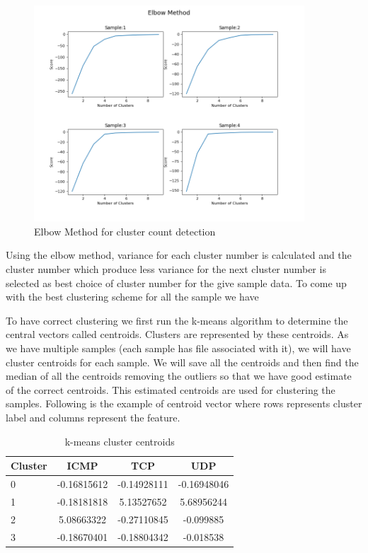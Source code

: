 \documentclass[10pt,oneside,a4paper]{article}
\begin{document}
\begin{figure}[H]
\centering
\includegraphics[width=0.90\textwidth]{elbow-method}
\caption{Elbow Method for cluster count detection} \label{fig:elbowmethod}
\end{figure}

Using the elbow method, variance for each cluster number is calculated and the cluster number which produce less variance for the next cluster number is selected as best choice of cluster number for the give sample data. To come up with the best clustering scheme for all the sample we have

To have correct clustering we first run the k-means algorithm to determine the central vectors called centroids. Clusters are represented by these centroids. As we have multiple samples (each sample has file associated with it), we will have cluster centroids for each sample. We will save all the centroids and then find the median of all the centroids removing the outliers so that we have good estimate of the correct centroids. This estimated centroids are used for clustering the samples. Following is the example of centroid vector where rows represents cluster label and columns represent the feature.

\begin{table}[H]
\centering
  \begin{tabular}{ l | c  c  c }
    Cluster      & ICMP  & TCP  & UDP \\
    \hline
    0         &{-0.16815612}       &{-0.14928111}    &{-0.16948046} \\
    1         &{-0.18181818}       &{5.13527652}     &{5.68956244} \\
    2         &{5.08663322}        &{-0.27110845}    &{-0.099885} \\
    3         &{-0.18670401}       &{-0.18804342}    &{-0.018538} \\
  \end{tabular}
\caption{k-means cluster centroids} \label{table:centroids}
\end{table}
\end{document}
